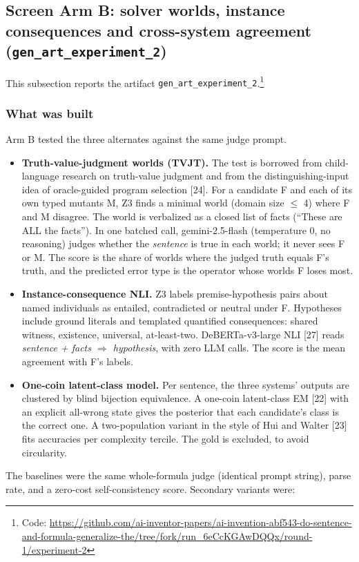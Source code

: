 \documentclass[11pt,letterpaper]{article}
\begin{document}
\subsection{Screen Arm B: solver worlds, instance consequences and cross-system agreement (\texorpdfstring{\textup{\nolinkurl{gen_art_experiment_2}}}{gen art experiment 2})}

This subsection reports the artifact \texorpdfstring{\textup{\nolinkurl{gen_art_experiment_2}}}{gen art experiment 2}.\footnote{Code: \url{https://github.com/ai-inventor-papers/ai-invention-abf543-do-sentence-and-formula-generalize-the/tree/fork/run_6eCcKGAwDQQx/round-1/experiment-2}}

\subsubsection{What was built}

Arm B tested the three alternates against the same judge prompt.

\begin{itemize}
\item {}\textbf{Truth-value-judgment worlds (TVJT).} The test is borrowed from child-language research on truth-value judgment and from the distinguishing-input idea of oracle-guided program selection [24]. For a candidate F and each of its own typed mutants M, Z3 finds a minimal world (domain size $\leq$ 4) where F and M disagree. The world is verbalized as a closed list of facts (``These are ALL the facts''). In one batched call, gemini-2.5-flash (temperature 0, no reasoning) judges whether the \emph{sentence} is true in each world; it never sees F or M. The score is the share of worlds where the judged truth equals F's truth, and the predicted error type is the operator whose worlds F loses most.
\item {}\textbf{Instance-consequence NLI.} Z3 labels premise-hypothesis pairs about named individuals as entailed, contradicted or neutral under F. Hypotheses include ground literals and templated quantified consequences: shared witness, existence, universal, at-least-two. DeBERTa-v3-large NLI [27] reads \emph{sentence + facts $\Rightarrow$ hypothesis}, with zero LLM calls. The score is the mean agreement with F's labels.
\item {}\textbf{One-coin latent-class model.} Per sentence, the three systems' outputs are clustered by blind bijection equivalence. A one-coin latent-class EM [22] with an explicit all-wrong state gives the posterior that each candidate's class is the correct one. A two-population variant in the style of Hui and Walter [23] fits accuracies per complexity tercile. The gold is excluded, to avoid circularity.
\end{itemize}
The baselines were the same whole-formula judge (identical prompt string), parse rate, and a zero-cost self-consistency score. Secondary variants were:
\end{document}
